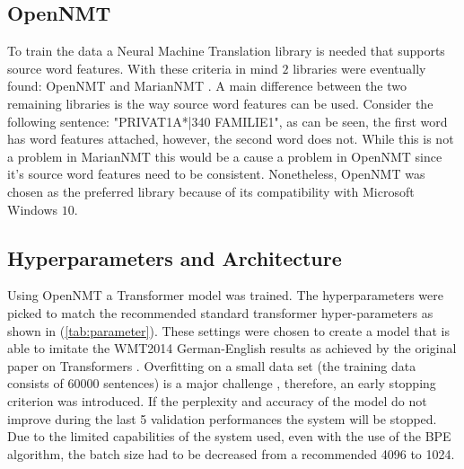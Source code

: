 \subsection{OpenNMT}
 
To train the data a Neural Machine Translation library is needed that supports source word features. With these criteria in mind $2$ libraries were eventually found: OpenNMT \cite{klein-etal-2017-opennmt} and MarianNMT \cite{mariannmt}. A main difference between the two remaining libraries is the way source word features can be used. Consider the following sentence: "PRIVAT1A*|340 FAMILIE1", as can be seen, the first word has word features attached, however, the second word does not. While this is not a problem in MarianNMT this would be a cause a problem in OpenNMT since it's source word features need to be consistent. Nonetheless, OpenNMT was chosen as the preferred library because of its compatibility with Microsoft Windows $10$. 

\subsection{Hyperparameters and Architecture}

Using OpenNMT \cite{klein-etal-2017-opennmt} a Transformer model was trained. The hyperparameters were picked to match the recommended standard transformer hyper-parameters \cite{standard_hyperparameters} as shown in (\autoref{tab:parameter}). These settings were chosen to create a model that is able to imitate the WMT2014 German-English \cite{WMT2014} results as achieved by the original paper on Transformers \cite{vaswani2017attention}. Overfitting on a small data set (the training data consists of $60000$ sentences) is a major challenge \cite{barone2017regularization}, therefore,  an early stopping criterion was introduced. If the perplexity and accuracy of the model do not improve during the last 5 validation performances the system will be stopped. Due to the limited capabilities of the system used, even with the use of the BPE algorithm, the batch size had to be decreased from a recommended 4096 to 1024.



